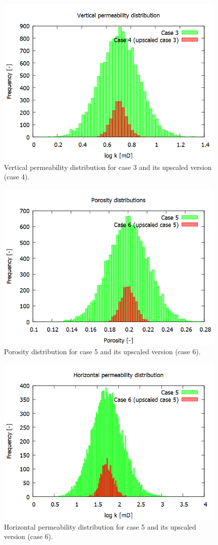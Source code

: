\begin{figure}[H]
	\centering
	\includegraphics[width=0.82\linewidth]{Images/39}
	\caption{Vertical permeability distribution for case 3 and its upscaled version (case 4).}
	\label{fig:39}
\end{figure}
\begin{figure}[H]
	\centering
	\includegraphics[width=0.82\linewidth]{Images/42}
	\caption{Porosity distribution for case 5 and its upscaled version (case 6).}
	\label{fig:42}
\end{figure}
\begin{figure}[H]
	\centering
	\includegraphics[width=0.82\linewidth]{Images/41}
	\caption{Horizontal permeability distribution for case 5 and its upscaled version (case 6).}
	\label{fig:41}
\end{figure}
